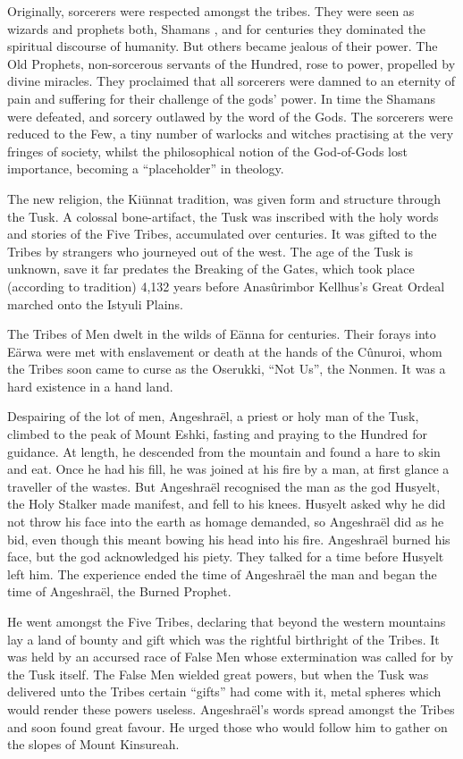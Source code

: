 \documentclass[]{book}
\begin{document}
Originally, sorcerers were respected amongst the tribes. They were seen as wizards and
prophets both, Shamans , and for centuries they dominated the spiritual discourse of
humanity. But others became jealous of their power. The Old Prophets, non-sorcerous
servants of the Hundred, rose to power, propelled by divine miracles. They proclaimed
that all sorcerers were damned to an eternity of pain and suffering for their challenge of
the gods' power. In time the Shamans were defeated, and sorcery outlawed by the word
of the Gods. The sorcerers were reduced to the Few, a tiny number of warlocks and
witches practising at the very fringes of society, whilst the philosophical notion of the
God-of-Gods lost importance, becoming a ``placeholder'' in theology.

The new religion, the Kiünnat tradition, was given form and structure through the
Tusk. A colossal bone-artifact, the Tusk was inscribed with the holy words and stories of
the Five Tribes, accumulated over centuries. It was gifted to the Tribes by strangers who
journeyed out of the west. The age of the Tusk is unknown, save it far predates the
Breaking of the Gates, which took place (according to tradition) 4,132 years before
Anasûrimbor Kellhus's Great Ordeal marched onto the Istyuli Plains.

The Tribes of Men dwelt in the wilds of Eänna for centuries. Their forays into Eärwa
were met with enslavement or death at the hands of the Cûnuroi, whom the Tribes
soon came to curse as the Oserukki, ``Not Us'', the Nonmen. It was a hard existence in a
hand land.

Despairing of the lot of men, Angeshraël, a priest or holy man of the Tusk, climbed to
the peak of Mount Eshki, fasting and praying to the Hundred for guidance. At length,
he descended from the mountain and found a hare to skin and eat. Once he had his
fill, he was joined at his fire by a man, at first glance a traveller of the wastes. But
Angeshraël recognised the man as the god Husyelt, the Holy Stalker made manifest,
and fell to his knees. Husyelt asked why he did not throw his face into the earth as
homage demanded, so Angeshraël did as he bid, even though this meant bowing his
head into his fire. Angeshraël burned his face, but the god acknowledged his piety.
They talked for a time before Husyelt left him. The experience ended the time of
Angeshraël the man and began the time of Angeshraël, the Burned Prophet.

He went amongst the Five Tribes, declaring that beyond the western mountains lay a
land of bounty and gift which was the rightful birthright of the Tribes. It was held by an
accursed race of False Men whose extermination was called for by the Tusk itself. The
False Men wielded great powers, but when the Tusk was delivered unto the Tribes
certain ``gifts'' had come with it, metal spheres which would render these powers useless.
Angeshraël's words spread amongst the Tribes and soon found great favour. He urged
those who would follow him to gather on the slopes of Mount Kinsureah.
\end{document}
